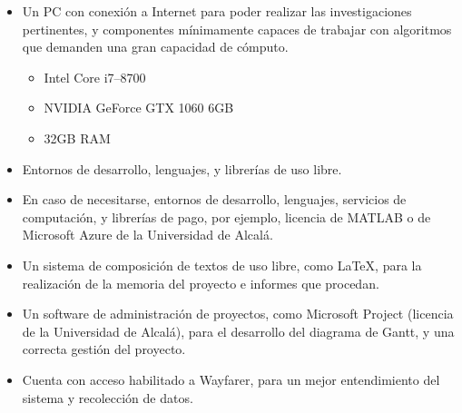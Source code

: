 \documentclass[12pt]{article}
\begin{document}
		\begin{itemize}
			\item Un PC con conexión a Internet para poder realizar las investigaciones pertinentes, y componentes mínimamente capaces de trabajar con algoritmos que demanden una gran capacidad de cómputo. 
			
			\begin{itemize}
				\item Intel Core i7--8700
				\item NVIDIA GeForce GTX 1060 6GB
				\item 32GB RAM
			\end{itemize}
			
			\item Entornos de desarrollo, lenguajes, y librerías de uso libre. 
			
			\item En caso de necesitarse, entornos de desarrollo, lenguajes, servicios de computación, y librerías de pago, por ejemplo, licencia de MATLAB o de Microsoft Azure de la Universidad de Alcalá. 
			
			\item Un sistema de composición de textos de uso libre, como \LaTeX{}, para la realización de la memoria del proyecto e informes que procedan. 
			
			\item Un software de administración de proyectos, como Microsoft Project (licencia de la Universidad de Alcalá), para el desarrollo del diagrama de Gantt, y una correcta gestión del proyecto. 
			
			\item Cuenta con acceso habilitado a Wayfarer, para un mejor entendimiento del sistema y recolección de datos. 
		\end{itemize}
	
	\printbibliography
\end{document}
